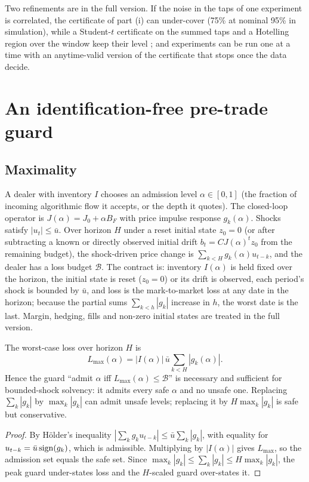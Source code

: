     Two refinements are in the full version. If the noise in the taps of one experiment is correlated, the certificate of part (i) can under-cover (75\% at nominal 95\% in simulation), while a Student-$t$ certificate on the summed taps and a Hotelling region over the window keep their level \citep{p2:hotelling1931}; and experiments can be run one at a time with an anytime-valid version of the certificate that stops once the data decide.

    \section{An identification-free pre-trade guard}\label{p2:sec:guard}

    \subsection{Maximality}
A dealer with inventory $I$ chooses an admission level $\alpha\in[0,1]$ (the fraction of incoming algorithmic flow it accepts, or the depth it quotes). The closed-loop operator is $J(\alpha)=J_0+\alpha B_F$ with price impulse response $g_k(\alpha)$. Shocks satisfy $|u_t|\le\bar u$. Over horizon $H$ under a reset initial state $z_0=0$ (or after subtracting a known or directly observed initial drift $b_t=CJ(\alpha)^t z_0$ from the remaining budget), the shock-driven price change is $\sum_{k<H}g_k(\alpha)u_{t-k}$, and the dealer has a loss budget $\mathcal B$. The contract is: inventory $I(\alpha)$ is held fixed over the horizon, the initial state is reset ($z_0=0$) or its drift is observed, each period's shock is bounded by $\bar u$, and loss is the mark-to-market loss at any date in the horizon; because the partial sums $\sum_{k<h}|g_k|$ increase in $h$, the worst date is the last. Margin, hedging, fills and non-zero initial states are treated in the full version.

\begin{lemma}\label{p2:thm:guard}
The worst-case loss over horizon $H$ is
\[
L_{\max}(\alpha)=|I(\alpha)|\,\bar u\sum_{k<H}|g_k(\alpha)|.
\]
Hence the guard ``admit $\alpha$ iff $L_{\max}(\alpha)\le\mathcal B$'' is necessary and sufficient for bounded-shock solvency: it admits every safe $\alpha$ and no unsafe one. Replacing $\sum_k|g_k|$ by $\max_k|g_k|$ can admit unsafe levels; replacing it by $H\max_k|g_k|$ is safe but conservative.
\end{lemma}

\begin{proof}
By H\"older's inequality $|\sum_kg_ku_{t-k}|\le\bar u\sum_k|g_k|$, with equality for $u_{t-k}=\bar u\,{\rm sign}(g_k)$, which is admissible. Multiplying by $|I(\alpha)|$ gives $L_{\max}$, so the admission set equals the safe set. Since $\max_k|g_k|\le\sum_k|g_k|\le H\max_k|g_k|$, the peak guard under-states loss and the $H$-scaled guard over-states it.
\end{proof}

